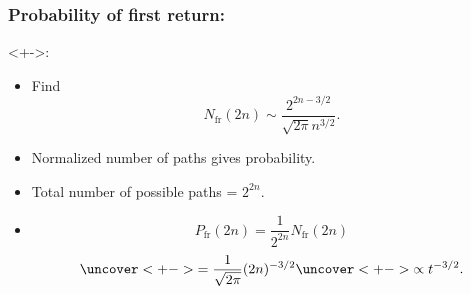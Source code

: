 

\begin{frame}
  \frametitle{Probability of first return:}

  \begin{block}<+->{:}
    \begin{itemize}
    \item<+-> 
      Find 
      $$
      \boxed{
        N_{\textrm{fr}}(2n) \sim 
        \frac{
          2^{2n-3/2}
        }
        {
          \sqrt{2 \pi} n^{3/2}
        }.
      }
      $$
    \item<+-> 
      Normalized number of paths gives probability.
    \item<+-> 
      Total number of possible paths = $2^{2n}$.
    \item<+->
      $$ 
      P_{\textrm{fr}}(2n) = \frac{1}{2^{2n}} N_{\textrm{fr}}(2n)
      $$
      $$
      \uncover<+->{
        =  \frac{1}{\sqrt{2 \pi}}
        (2n)^{-3/2}
      }
      \uncover<+->{
        \propto t^{-3/2}.
      }
      $$
    \end{itemize}
    \end{block}
  
\end{frame}

